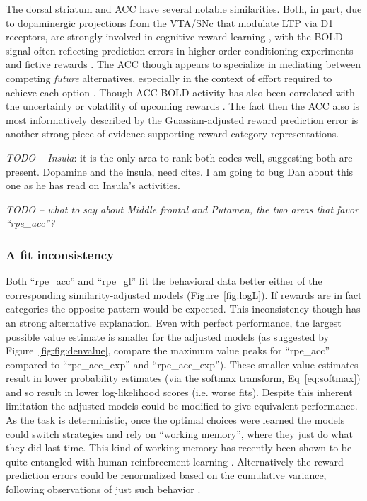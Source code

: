 \documentclass[doc,12pt]{apa}        %
\begin{document}
The dorsal striatum and ACC have several notable similarities.  Both, in part, due to dopaminergic projections from the VTA/SNc that modulate LTP via D1 receptors\cite{Schweimer:2006p9780}, are strongly involved in cognitive reward learning \cite{Atlas:2010p7566,Hayden:2009p6545,Rudebeck:2008p4712,Rolls:2008p7577,Quilodran:2008p2645,Hampton:2007p2983,Ernst:2004p3998}, with the BOLD signal often reflecting prediction errors in higher-order conditioning experiments \cite{seymour:2004aa} and fictive rewards \cite{Hayden:2009p6545}.  The ACC though appears to specialize in mediating between competing \emph{future} alternatives, especially in the context of effort required to achieve each option \cite{Quilodran:2008p2645}.  Though ACC BOLD activity has also been correlated with the uncertainty or volatility of upcoming rewards \cite{Behrens:2007p8839}.  The fact then the ACC also is most informatively described by the Guassian-adjusted reward prediction error is another strong piece of evidence supporting reward category representations.  

\emph{TODO -- Insula}: it is the only area to rank both codes well, suggesting both are present.  Dopamine and the insula, need cites.  I am going to bug Dan about this one as he has read on Insula's activities.

\emph{TODO -- what to say about Middle frontal and Putamen, the two areas that favor ``rpe\_acc''?}

\subsubsection{A fit inconsistency}
\label{subsub:inconsistency}
Both ``rpe\_acc'' and ``rpe\_gl'' fit the behavioral data better either of the corresponding similarity-adjusted models (Figure~\ref{fig:logL}).  If rewards are in fact categories the opposite pattern would be expected.  This inconsistency though has an strong alternative explanation.  Even with perfect performance, the largest possible value estimate is smaller for the adjusted models (as suggested by Figure~\ref{fig:fig:denvalue}, compare the maximum value peaks for ``rpe\_acc'' compared to ``rpe\_acc\_exp'' and ``rpe\_acc\_exp'').  These smaller value estimates result in lower probability estimates (via the softmax transform, Eq~\ref{eq:softmax}) and so result in lower log-likelihood scores (i.e. worse fits).  Despite this inherent limitation the adjusted models could be modified to give equivalent performance.  As the task is deterministic, once the optimal choices were learned the models could switch strategies and rely on ``working memory'', where they just do what they did last time.  This kind of working memory has recently been shown to be quite entangled with human reinforcement learning \cite{Collins:2012p9779}.  Alternatively the reward prediction errors could be renormalized based on the cumulative variance, following observations of just such behavior \cite{Tobler:2005p6373}.
\end{document}
